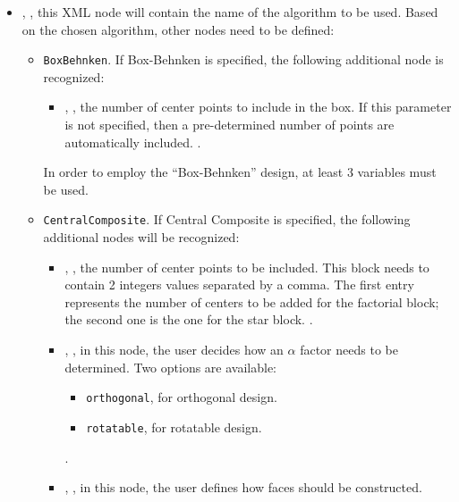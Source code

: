      \begin{itemize}
      \item {}, , this XML node
        will contain the name of the algorithm to be used.
        Based on the chosen algorithm, other nodes need to be defined:
        \begin{itemize}
          \item {}\texttt{BoxBehnken}. If Box-Behnken
            is specified, the following additional node is recognized:
         \begin{itemize}
          \item {}, , the
            number of center points to include in the box.
            If this parameter is not specified, then a pre-determined number of
            points are automatically included.
            .
         \end{itemize}
         \nb In order to employ the ``Box-Behnken'' design, at least 3 variables
         must be used.
         \item {}\texttt{CentralComposite}. If
           Central Composite is specified, the following additional nodes will
           be recognized:
         \begin{itemize}
          \item {}, , the number of center points to be included.
            This block needs to contain 2 integers values separated by a comma.
            The first entry represents the number of centers to be added for the
            factorial block; the second one is the one for the star block.
            .
          \item {}, , in this node,
            the user decides how an $\alpha$ factor needs to be determined.
            Two options are available:
            \begin{itemize}
              \item \texttt{orthogonal}, for orthogonal design.
              \item \texttt{rotatable}, for rotatable design.
            \end{itemize}
            .
          \item {}, , in this node,
            the user defines how faces should be constructed.

\end{itemize}
\end{itemize}
\end{itemize}
